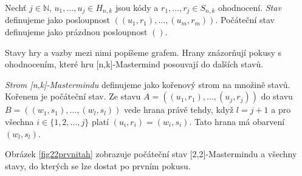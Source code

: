 \begin{definice}[Stav]\label{stav}
   Nechť $j \in \mathbb{N}$, $u_1, \dots , u_j \in H_{n,k}$ jsou kódy a $r_1, \dots, r_j \in S_{n,k}$ ohodnocení. \emph{Stav} definujeme jako posloupnost $((u_1, r_1), \dots, (u_m, r_m))$. Počáteční stav definujeme jako prázdnou posloupnost $()$.
\end{definice}

Stavy hry a vazby mezi nimi popíšeme grafem. Hrany znázorňují pokusy s ohodnocením, které hru [n,k]-Mastermind posouvají do dalších stavů. 
\begin{definice}
  \emph{Strom [n,k]-Mastermindu} definujeme jako kořenový strom na množině stavů. Kořenem je počáteční stav. Ze stavu $A = \left((u_1, r_1),\dots, (u_j,r_j)\right)$ do stavu $B = \left((w_1, s_1), \dots, (w_l,s_l)\right)$ vede hrana právě tehdy, když $l = j+1$ a pro všechna $ i \in \{1,2,\dots, j\}$ platí $ (u_i, r_i) = (w_i, s_i)$. Tato hrana má obarvení $(w_l, s_l)$. 
\end{definice}

Obrázek \ref{fig22prvnitah} zobrazuje počáteční stav [2,2]-Mastermindu a všechny stavy, do kterých se lze dostat po prvním pokusu. 


